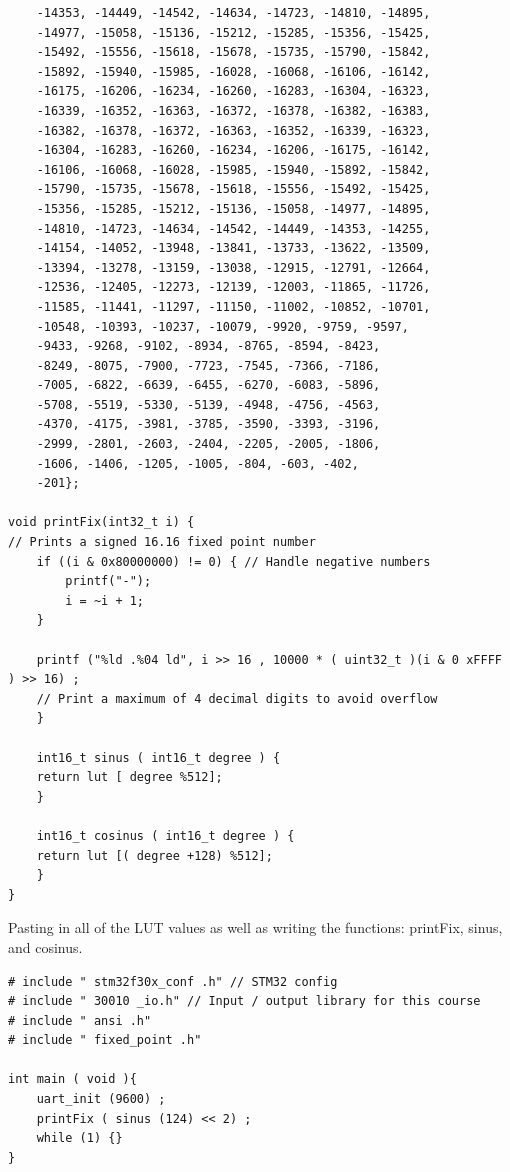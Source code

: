 \begin{lstlisting}
    -14353, -14449, -14542, -14634, -14723, -14810, -14895,
    -14977, -15058, -15136, -15212, -15285, -15356, -15425,
    -15492, -15556, -15618, -15678, -15735, -15790, -15842,
    -15892, -15940, -15985, -16028, -16068, -16106, -16142,
    -16175, -16206, -16234, -16260, -16283, -16304, -16323,
    -16339, -16352, -16363, -16372, -16378, -16382, -16383,
    -16382, -16378, -16372, -16363, -16352, -16339, -16323,
    -16304, -16283, -16260, -16234, -16206, -16175, -16142,
    -16106, -16068, -16028, -15985, -15940, -15892, -15842,
    -15790, -15735, -15678, -15618, -15556, -15492, -15425,
    -15356, -15285, -15212, -15136, -15058, -14977, -14895,
    -14810, -14723, -14634, -14542, -14449, -14353, -14255,
    -14154, -14052, -13948, -13841, -13733, -13622, -13509,
    -13394, -13278, -13159, -13038, -12915, -12791, -12664,
    -12536, -12405, -12273, -12139, -12003, -11865, -11726,
    -11585, -11441, -11297, -11150, -11002, -10852, -10701,
    -10548, -10393, -10237, -10079, -9920, -9759, -9597,
    -9433, -9268, -9102, -8934, -8765, -8594, -8423,
    -8249, -8075, -7900, -7723, -7545, -7366, -7186,
    -7005, -6822, -6639, -6455, -6270, -6083, -5896,
    -5708, -5519, -5330, -5139, -4948, -4756, -4563,
    -4370, -4175, -3981, -3785, -3590, -3393, -3196,
    -2999, -2801, -2603, -2404, -2205, -2005, -1806,
    -1606, -1406, -1205, -1005, -804, -603, -402,
    -201};

void printFix(int32_t i) {
// Prints a signed 16.16 fixed point number
    if ((i & 0x80000000) != 0) { // Handle negative numbers
        printf("-");
        i = ~i + 1;
    }

    printf ("%ld .%04 ld", i >> 16 , 10000 * ( uint32_t )(i & 0 xFFFF ) >> 16) ;
    // Print a maximum of 4 decimal digits to avoid overflow
    }

    int16_t sinus ( int16_t degree ) {
    return lut [ degree %512];
    }

    int16_t cosinus ( int16_t degree ) {
    return lut [( degree +128) %512];
    }
}

\end{lstlisting}

\vspace{-1em}

Pasting in all of the LUT values as well as writing the functions: printFix, sinus, and cosinus.

\vspace{1em}

\begin{lstlisting}
# include " stm32f30x_conf .h" // STM32 config
# include " 30010 _io.h" // Input / output library for this course
# include " ansi .h"
# include " fixed_point .h"

int main ( void ){
    uart_init (9600) ;
    printFix ( sinus (124) << 2) ;
    while (1) {}
}
\end{lstlisting}

